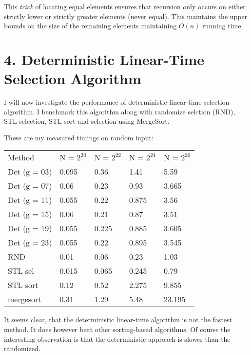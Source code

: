 \documentclass[10pt,oneside,a4paper,final,english]{memoir}
\begin{document}
This \textit{trick} of locating equal elements ensures that recursion
only occurs on either strictly lower or strictly greater elements
(never equal). This maintains the upper bounds on the size of the
remaining elements maintaining $O(n)$ running time.

\section*{4. Deterministic Linear-Time Selection Algorithm}
I will now investigate the performance of deterministic linear-time
selection algorithm. I benchmark this algorithm along with randomize
selction (RND), STL selection, STL sort and selection using MergeSort.

These are my measured timings on random input:\\
\begin{tabular}{lllll}
Method & N = $2^{20}$ & N = $2^{22}$ & N = $2^{24}$ & N = $2^{26}$ \\
    Det (g = 03) &  0.095 &  0.36 &  1.41 &  5.59 \\
    Det (g = 07) & 0.06 & 0.23 & 0.93 & 3.665 \\
    Det (g = 11) & 0.055 & 0.22 & 0.875 & 3.56 \\
    Det (g = 15) & 0.06 & 0.21 & 0.87 & 3.51 \\
    Det (g = 19) & 0.055 & 0.225 & 0.885 & 3.605 \\
    Det (g = 23) & 0.055 & 0.22 & 0.895 & 3.545 \\
             RND &  0.01 &  0.06 &  0.23 &  1.03 \\
         STL sel & 0.015 & 0.065 & 0.245 & 0.79 \\
        STL sort & 0.12 & 0.52 & 2.275 & 9.855 \\
       mergesort & 0.31 & 1.29 & 5.48 & 23.195
\end{tabular}

It seems clear, that the deterministic linear-time algorithm is not
the fastest method. It does however beat other sorting-based
algorithms. Of course the interesting observation is that the
deterministic approach is slower than the randomized.
\end{document}
